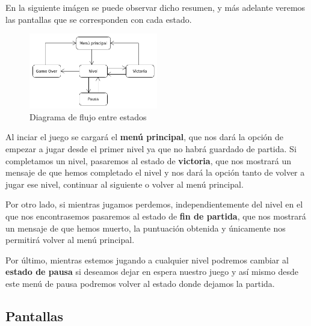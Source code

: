  En la siguiente imágen se puede observar dicho resumen, y más adelante veremos las pantallas que se corresponden con cada estado.
 
  \vspace{0.5cm}
 
 \begin{figure}[htbp]
\centering
  \includegraphics[width=0.5\textwidth]{archivos/diagramaflujo.png}
  \caption{Diagrama de flujo entre estados}
  \label{fig:diagflujo}
\end{figure}

 \vspace{0.5cm}

Al inciar el juego se cargará el \textbf{menú principal}, que nos dará la opción de empezar a jugar desde el primer nivel ya que no habrá guardado de partida. Si completamos un nivel, pasaremos al estado de \textbf{victoria}, que nos mostrará un mensaje de que hemos completado el nivel y nos dará la opción tanto de volver a jugar ese nivel, continuar al siguiente o volver al menú principal.

 \vspace{0.5cm}

Por otro lado, si mientras jugamos perdemos, independientemente del nivel en el que nos encontrasemos pasaremos al estado de \textbf{fin de partida}, que nos mostrará un mensaje de que hemos muerto, la puntuación obtenida y únicamente nos permitirá volver al menú principal.

 \vspace{0.5cm}

Por último, mientras estemos jugando a cualquier nivel podremos cambiar al \textbf{estado de pausa} si deseamos dejar en espera nuestro juego y así mismo desde este menú de pausa podremos volver al estado donde dejamos la partida.

 \vspace{0.5cm}

\subsection{Pantallas}

